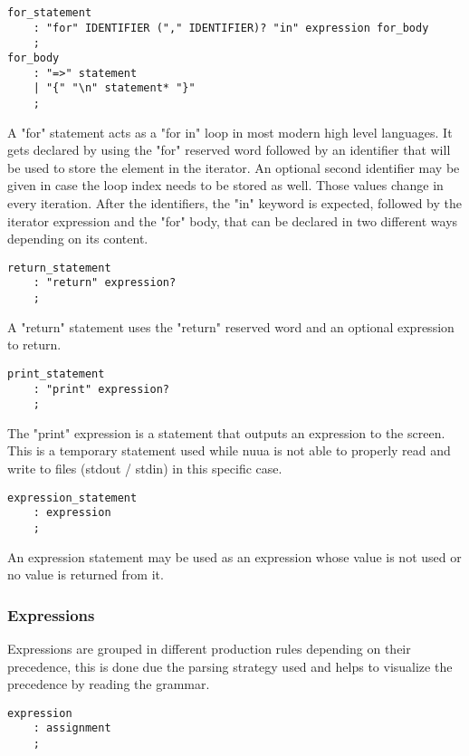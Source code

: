\begin{lstlisting}
for_statement
    : "for" IDENTIFIER ("," IDENTIFIER)? "in" expression for_body
    ;
for_body
    : "=>" statement
    | "{" "\n" statement* "}"
    ;
\end{lstlisting}

A "for" statement acts as a "for in" loop in most modern high level languages. It gets declared by using the "for" reserved word followed by an
identifier that will be used to store the element in the iterator. An optional second identifier may be given in case the loop index needs to be
stored as well. Those values change in every iteration. After the identifiers, the "in" keyword is expected, followed by the iterator expression and the
"for" body, that can be declared in two different ways depending on its content.

\begin{lstlisting}
return_statement
    : "return" expression?
    ;
\end{lstlisting}

A "return" statement uses the "return" reserved word and an optional expression to return.

\begin{lstlisting}
print_statement
    : "print" expression?
    ;
\end{lstlisting}

The "print" expression is a statement that outputs an expression to the screen. This is a temporary statement used while
nuua is not able to properly read and write to files (stdout / stdin) in this specific case.

\begin{lstlisting}
expression_statement
    : expression
    ;
\end{lstlisting}

An expression statement may be used as an expression whose value is not used or no value is returned from it.

\subsubsection{Expressions}

Expressions are grouped in different production rules depending on their precedence, this is done due the parsing strategy used and
helps to visualize the precedence by reading the grammar.

\begin{lstlisting}
expression
    : assignment
    ;
\end{lstlisting}

